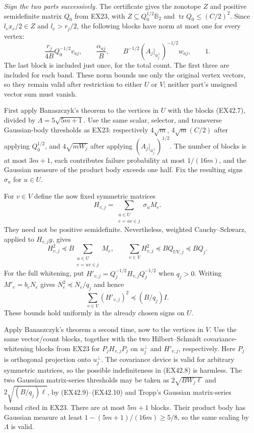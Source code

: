 \emph{Sign the two parts successively.}
The certificate gives the zonotope $Z$ and positive semidefinite
matrix $Q_0$ from EX23, with
$Z\subseteq Q_0^{1/2}\mathbb B_2$ and
$\operatorname{tr}Q_0\le(C/2)^2$.
Since $l_ex_e/2\in Z$ and $l_e>r_j/2$, the following blocks have
norm at most one for every vertex:
\[
 \frac{r_j}{4B}Q_0^{-1/2}v_{aj},\qquad
 \frac{\alpha_{aj}}B,\qquad
 B^{-1/2}(A_j|_{u_j^\perp})^{-1/2}w_{aj},\qquad 1.
 \tag{EX42.7}
\]
The last block is included just once, for the total count. The first
three are included for each band. These norm bounds use only the
original vertex vectors, so they remain valid after restriction to
either $U$ or $V$; neither part's unsigned vector sum must vanish.

First apply Banaszczyk's theorem to the vertices in $U$ with the
blocks (EX42.7), divided by
$\Lambda=5\sqrt{5m+1}$. Use the same scalar, selector, and transverse
Gaussian-body thresholds as EX23: respectively $4\sqrt m$,
$4\sqrt m(C/2)$ after applying $Q_0^{1/2}$, and
$4\sqrt{mW_j}$ after applying $(A_j|_{u_j^\perp})^{1/2}$.
The number of blocks is at most $3m+1$, each contributes failure
probability at most $1/(16m)$, and the Gaussian measure of the
product body exceeds one half. Fix the resulting signs
$\sigma_u$ for $u\in U$.

For $v\in V$ define the now fixed symmetric matrices
\[
 H_{v,j}=\sum_{\substack{u\in U\\e=uv\in j}}\sigma_uM_e.
 \tag{EX42.8}
\]
They need not be positive semidefinite. Nevertheless, weighted
Cauchy--Schwarz, applied to $H_{v,j}y$, gives
\[
 H_{v,j}^2\preceq
 B\sum_{\substack{u\in U\\e=uv\in j}}M_e,
 \qquad
 \sum_{v\in V}H_{v,j}^2\preceq BQ_{UV,j}\preceq BQ_j.
 \tag{EX42.9}
\]
For the full whitening, put
$H'_{v,j}=Q_j^{-1/2}H_{v,j}Q_j^{-1/2}$ when $q_j>0$.
Writing $M'_e=b_eN_e$ gives $N_e^2\preceq N_e/q_j$ and hence
\[
             \sum_{v\in V}(H'_{v,j})^2\preceq (B/q_j)I.
 \tag{EX42.10}
\]
These bounds hold uniformly in the already chosen signs on $U$.

Apply Banaszczyk's theorem a second time, now to the vertices in $V$.
Use the same vector/count blocks, together with the two Hilbert--Schmidt
covariance-whitening blocks from EX23 for
$P_jH_{v,j}P_j$ on $u_j^\perp$ and $H'_{v,j}$, respectively.
Here $P_j$ is orthogonal projection onto $u_j^\perp$. The covariance
device is valid for arbitrary symmetric matrices, so the possible
indefiniteness in (EX42.8) is harmless. The two Gaussian matrix-series
thresholds may be taken as
$2\sqrt{BW_j\ell}$ and $2\sqrt{(B/q_j)\ell}$, by
(EX42.9)--(EX42.10) and Tropp's Gaussian matrix-series bound cited in
EX23. There are at most $5m+1$ blocks. Their product body has Gaussian
measure at least $1-(5m+1)/(16m)\ge5/8$, so the same scaling by
$\Lambda$ is valid.

